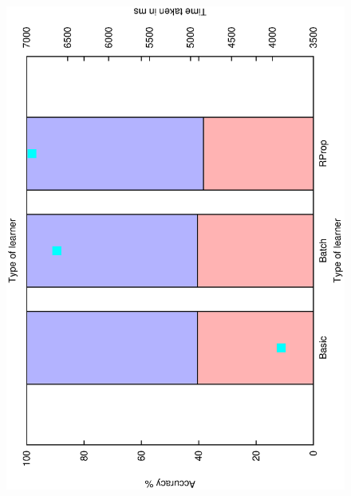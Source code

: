 \documentclass[12pt,a4,notitlepage]{report}
\renewcommand{\_}{\texttt{\symbol{95}}}
\newcommand{\<}{\texttt{\symbol{60}}}
\renewcommand{\>}{\texttt{\symbol{62}}}
\begin{document}
\begin{figure}
\includegraphics[scale=0.3,angle=-90]{results/neural/n_learner.ps}

\end{figure}
\end{document}
